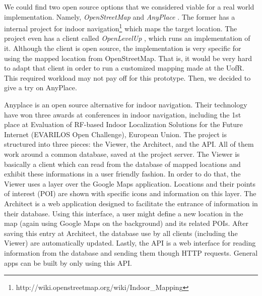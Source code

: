 We could find two open source options that we considered viable for a real world implementation.
Namely, \emph{OpenStreetMap} \cite{openmap16} and \emph{AnyPlace} \cite{anyplace15}.
The former has a internal project for indoor navigation\footnote{http://wiki.openstreetmap.org/wiki/Indoor\_Mapping} which maps the target location.
The project even has a client called \emph{OpenLevelUp} \cite{adrien15}, which runs an implementation of it.
Although the client is open source, the implementation is very specific for using the mapped location from OpenStreetMap.
That is, it would be very hard to adapt that client in order to run a customized mapping made at the UofR.
This required workload may not pay off for this prototype.
Then, we decided to give a try on AnyPlace.

Anyplace \cite{anyplace15,zeinalipour:IEEEIC16} is an open source alternative for indoor navigation.
Their technology have won three awards at conferences in indoor navigation, including the 1st place at Evaluation of RF-based Indoor Localization Solutions for the Future Internet (EVARILOS Open Challenge), European Union.
The project is structured into three pieces: the Viewer, the Architect, and the API.
All of them work around a common database, saved at the project server.
The Viewer is basically a client which can read from the database of mapped locations and exhibit these informations in a user friendly fashion.
In order to do that, the Viewer uses a layer over the Google Maps application.
Locations and their points of interest (POI) are shown with specific icons and information on this layer.
The Architect is a web application designed to facilitate the entrance of information in their database.
Using this interface, a user might define a new location in the map (again using Google Maps on the background) and its related POIs.
After saving this entry at Architect, the database use by all clients (including the Viewer) are automatically updated.
Lastly, the API is a web interface for reading information from the database and sending them though HTTP requests.
General apps can be built by only using this API.


